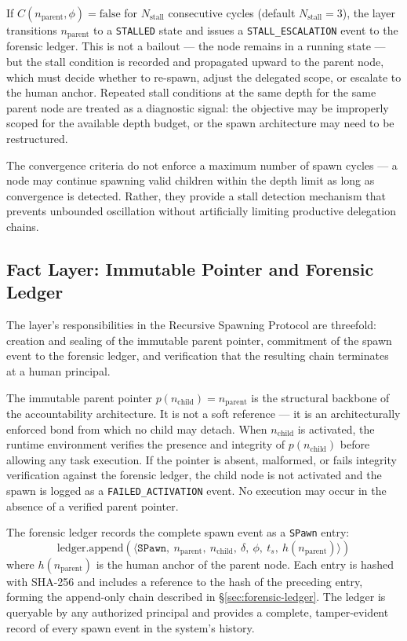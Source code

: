 If $C(n_{\text{parent}}, \phi) = \text{false}$ for $N_{\text{stall}}$ consecutive cycles (default $N_{\text{stall}} = 3$), the \bounds{} layer transitions $n_{\text{parent}}$ to a \texttt{STALLED} state and issues a \texttt{STALL\_ESCALATION} event to the forensic ledger. This is not a bailout — the node remains in a running state — but the stall condition is recorded and propagated upward to the parent node, which must decide whether to re-spawn, adjust the delegated scope, or escalate to the human anchor. Repeated stall conditions at the same depth for the same parent node are treated as a diagnostic signal: the objective may be improperly scoped for the available depth budget, or the spawn architecture may need to be restructured.

The convergence criteria do not enforce a maximum number of spawn cycles — a node may continue spawning valid children within the depth limit as long as convergence is detected. Rather, they provide a stall detection mechanism that prevents unbounded oscillation without artificially limiting productive delegation chains.

\subsection{Fact Layer: Immutable Pointer and Forensic Ledger}\label{sec:spawn-fact-layer}

The \fact{} layer's responsibilities in the Recursive Spawning Protocol are threefold: creation and sealing of the immutable parent pointer, commitment of the spawn event to the forensic ledger, and verification that the resulting chain terminates at a human principal.

The immutable parent pointer $p(n_{\text{child}}) = n_{\text{parent}}$ is the structural backbone of the \bxthree{} accountability architecture. It is not a soft reference — it is an architecturally enforced bond from which no child may detach. When $n_{\text{child}}$ is activated, the runtime environment verifies the presence and integrity of $p(n_{\text{child}})$ before allowing any task execution. If the pointer is absent, malformed, or fails integrity verification against the forensic ledger, the child node is not activated and the spawn is logged as a \texttt{FAILED\_ACTIVATION} event. No execution may occur in the absence of a verified parent pointer.

The forensic ledger records the complete spawn event as a \texttt{SPawn} entry:
\begin{equation}
\text{ledger.append}(\langle \texttt{SPawn},\ n_{\text{parent}},\ n_{\text{child}},\ \delta,\ \phi,\ t_s,\ h(n_{\text{parent}}) \rangle)
\end{equation}
where $h(n_{\text{parent}})$ is the human anchor of the parent node. Each entry is hashed with SHA-256 and includes a reference to the hash of the preceding entry, forming the append-only chain described in \S\ref{sec:forensic-ledger}. The ledger is queryable by any authorized principal and provides a complete, tamper-evident record of every spawn event in the system's history.

